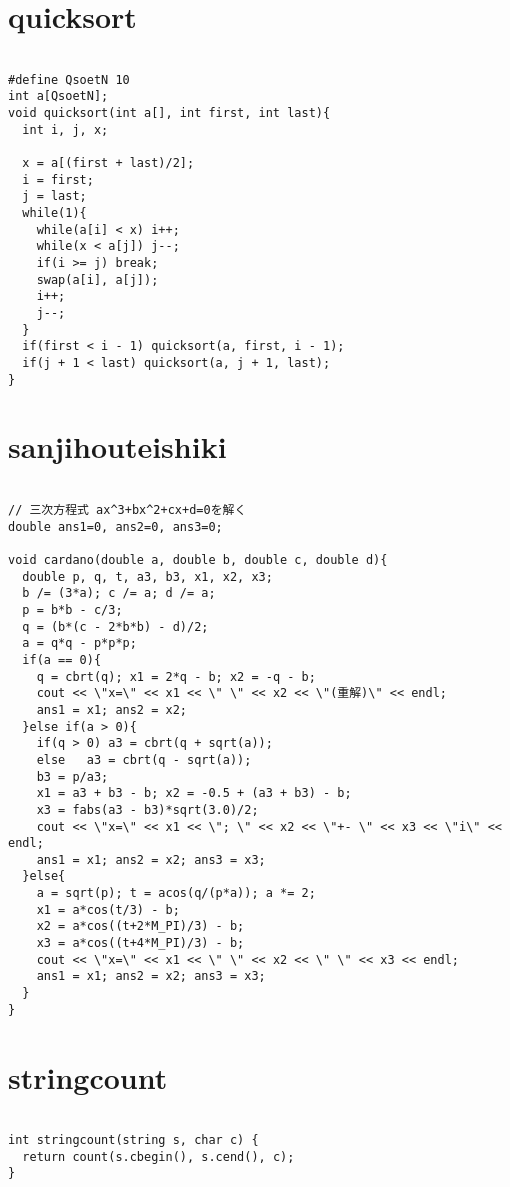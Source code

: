 \documentclass[a4j,titlepage]{jarticle} %
\begin{document}
\section{quicksort}
\color{black}
\begin{lstlisting}[caption=quicksort]

#define QsoetN 10
int a[QsoetN];
void quicksort(int a[], int first, int last){
  int i, j, x;

  x = a[(first + last)/2];
  i = first;
  j = last;
  while(1){
    while(a[i] < x) i++;
    while(x < a[j]) j--;
    if(i >= j) break;
    swap(a[i], a[j]);
    i++;
    j--;
  }
  if(first < i - 1) quicksort(a, first, i - 1);
  if(j + 1 < last) quicksort(a, j + 1, last);
}

\end{lstlisting}

\color{white}
\section{sanjihouteishiki}
\color{black}
\begin{lstlisting}[caption=sanjihouteishiki]

// 三次方程式 ax^3+bx^2+cx+d=0を解く 
double ans1=0, ans2=0, ans3=0;

void cardano(double a, double b, double c, double d){
  double p, q, t, a3, b3, x1, x2, x3;
  b /= (3*a); c /= a; d /= a;
  p = b*b - c/3;
  q = (b*(c - 2*b*b) - d)/2;
  a = q*q - p*p*p;
  if(a == 0){
    q = cbrt(q); x1 = 2*q - b; x2 = -q - b;
    cout << \"x=\" << x1 << \" \" << x2 << \"(重解)\" << endl;
    ans1 = x1; ans2 = x2;
  }else if(a > 0){
    if(q > 0) a3 = cbrt(q + sqrt(a));
    else   a3 = cbrt(q - sqrt(a));
    b3 = p/a3;
    x1 = a3 + b3 - b; x2 = -0.5 + (a3 + b3) - b;
    x3 = fabs(a3 - b3)*sqrt(3.0)/2;
    cout << \"x=\" << x1 << \"; \" << x2 << \"+- \" << x3 << \"i\" << endl;
    ans1 = x1; ans2 = x2; ans3 = x3;
  }else{
    a = sqrt(p); t = acos(q/(p*a)); a *= 2;
    x1 = a*cos(t/3) - b;
    x2 = a*cos((t+2*M_PI)/3) - b;
    x3 = a*cos((t+4*M_PI)/3) - b;
    cout << \"x=\" << x1 << \" \" << x2 << \" \" << x3 << endl;
    ans1 = x1; ans2 = x2; ans3 = x3;
  }
}

\end{lstlisting}

\color{white}
\section{stringcount}
\color{black}
\begin{lstlisting}[caption=stringcount]

int stringcount(string s, char c) {
  return count(s.cbegin(), s.cend(), c);
}

\end{lstlisting}
\end{document}
